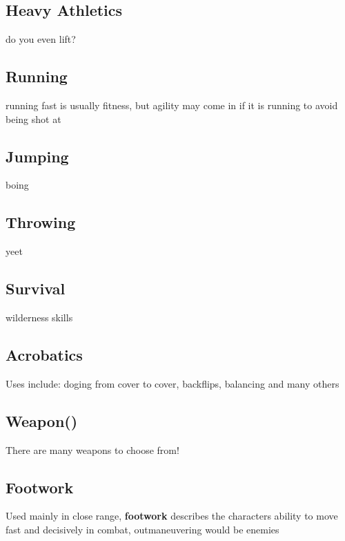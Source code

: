 \subsection{Heavy Athletics}\label{subsec:heavy-athletics}
do you even lift?
\subsection{Running}\label{subsec:running}
running fast is usually fitness, but agility may come in if it is running to avoid being shot at
\subsection{Jumping}\label{subsec:jumping}
boing
\subsection{Throwing}\label{subsec:throwing}
yeet
\subsection{Survival}\label{subsec:survival}
wilderness skills
\subsection{Acrobatics}\label{subsec:acrobatics}
Uses include: doging from cover to cover, backflips, balancing and many others
\subsection{Weapon()}\label{subsec:weapon}
There are many weapons to choose from!
\subsection{Footwork}\label{subsec:footwork}
Used mainly in close range, \textbf{footwork} describes the characters ability to move fast and decisively in combat,
outmaneuvering would be enemies